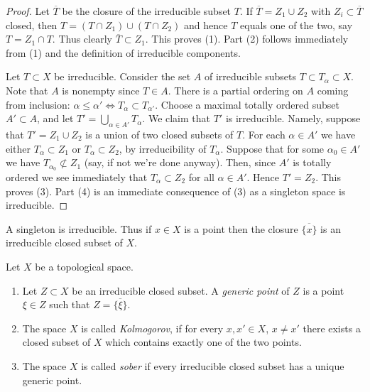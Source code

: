 \begin{proof}
Let $\overline{T}$ be the closure of the irreducible subset $T$.
If $\overline{T} = Z_1 \cup Z_2$ with $Z_i \subset \overline{T}$
closed, then $T = (T\cap Z_1) \cup (T \cap Z_2)$ and hence
$T$ equals one of the two, say $T = Z_1 \cap T$. Thus clearly
$\overline{T} \subset Z_1$. This proves (1). Part (2) follows
immediately from (1) and the definition of irreducible components.

\medskip\noindent
Let $T \subset X$ be irreducible. Consider the set $A$ of irreducible subsets
$T \subset T_\alpha \subset X$. Note that $A$ is nonempty since
$T \in A$. There is a partial ordering on $A$ coming from
inclusion: $\alpha \leq \alpha' \Leftrightarrow T_\alpha \subset T_{\alpha'}$.
Choose a maximal totally ordered subset $A' \subset A$, and let
$T' = \bigcup_{\alpha \in A'} T_\alpha$. We claim that $T'$ is
irreducible. Namely, suppose that $T' =  Z_1 \cup Z_2$ is a union
of two closed subsets of $T$. For each $\alpha \in A'$ we have
either $T_\alpha \subset Z_1$ or $T_\alpha \subset Z_2$, by irreducibility
of $T_\alpha$. Suppose that for some $\alpha_0 \in A'$ we have
$T_{\alpha_0} \not\subset Z_1$ (say, if not we're done anyway).
Then, since $A'$ is totally ordered we see immediately that
$T_\alpha \subset Z_2$ for all $\alpha \in A'$. Hence $T' = Z_2$.
This proves (3). Part (4) is an immediate consequence of (3)
as a singleton space is irreducible.
\end{proof}

\noindent
A singleton is irreducible. Thus if $x \in X$ is a point
then the closure $\overline{\{x\}}$ is an irreducible closed
subset of $X$.

\begin{definition}
\label{definition-generic-point}
Let $X$ be a topological space.
\begin{enumerate}
\item Let $Z \subset X$ be an irreducible closed subset.
A {\it generic point} of $Z$ is a point $\xi \in Z$ such
that $Z = \overline{\{\xi\}}$.
\item The space $X$ is called {\it Kolmogorov}, if for every $x, x' \in X$,
$x \not = x'$ there exists a closed subset of $X$ which contains
exactly one of the two points.
\item The space $X$ is called {\it sober} if every
irreducible closed subset has a unique generic point.
\end{enumerate}
\end{definition}

